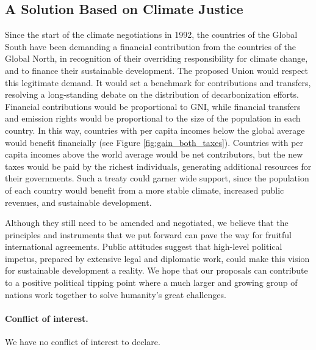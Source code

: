 \documentclass[12pt,english]{article}
\begin{document}
\begin{bibunit}
\section{A Solution Based on Climate Justice}
Since the start of the climate negotiations in 1992, the countries of the Global South have been demanding a financial contribution from the countries of the Global North, in recognition of their overriding responsibility for climate change, and to finance their sustainable development. The proposed Union would respect this legitimate demand. It would set a benchmark for contributions and transfers, resolving a long-standing debate on the distribution of decarbonization efforts. Financial contributions would be proportional to GNI, while financial transfers and emission rights would be proportional to the size of the population in each country. In this way, countries with per capita incomes below the global average would benefit financially (see Figure \ref{fig:gain_both_taxes}). Countries with per capita incomes above the world average would be net contributors, but the new taxes would be paid by the richest individuals, generating additional resources for their governments. Such a treaty could garner wide support, since the population of each country would benefit from a more stable climate, increased public revenues, and sustainable development.

Although they still need to be amended and negotiated, we believe that the principles and instruments that we put forward can pave the way for fruitful international agreements. Public attitudes suggest that high-level political impetus, prepared by extensive legal and diplomatic work, could make this vision for sustainable development a reality. We hope that our proposals can contribute to a positive political tipping point where a much larger and growing group of nations work together to solve humanity's great challenges.

\clearpage
\paragraph{Conflict of interest.} We have no conflict of interest to declare.


\renewcommand{\url}[1]{\href{#1}{Link}} %
% 
\putbib
\end{bibunit}
\end{document}
